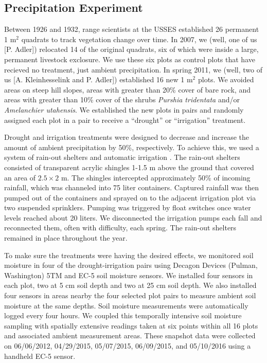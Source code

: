 \documentclass[fleqn,10pt]{wlpeerj} %
\begin{document}
\subsection{Precipitation Experiment}\label{precipitation-experiment}

Between 1926 and 1932, range scientists at the USSES established 26
permanent 1 m\(^2\) quadrats to track vegetation change over time. In
2007, we (well, one of us {[}P. Adler{]}) relocated 14 of the original
quadrats, six of which were inside a large, permanent livestock
exclosure. We use these six plots as control plots that have recieved no
treatment, just ambient precipitation. In spring 2011, we (well, two of
us {[}A. Kleinhesselink and P. Adler{]}) established 16 new 1 m\(^2\)
plots. We avoided areas on steep hill slopes, areas with greater than
20\% cover of bare rock, and areas with greater than 10\% cover of the
shrubs \emph{Purshia tridentata} and/or \emph{Amelanchier utahensis}. We
established the new plots in pairs and randomly assigned each plot in a
pair to receive a ``drought'' or ``irrigation'' treatment.

Drought and irrigation treatments were designed to decrease and increase
the amount of ambient precipitation by 50\%, respectively. To achieve
this, we used a system of rain-out shelters and automatic irrigation
\citep{Gherardi2013}. The rain-out shelters consisted of transparent
acrylic shingles 1-1.5 m above the ground that covered an area of
\(2.5\times2\) m. The shingles intercepted approximately 50\% of
incoming rainfall, which was channeled into 75 liter containers.
Captured rainfall was then pumped out of the containers and sprayed on
to the adjacent irrigation plot via two suspended sprinklers. Pumping
was triggered by float switches once water levels reached about 20
liters. We disconnected the irrigation pumps each fall and reconnected
them, often with difficulty, each spring. The rain-out shelters remained
in place throughout the year.

To make sure the treatments were having the desired effects, we
monitored soil moisture in four of the drought-irrigation pairs using
Decagon Devices (Pulman, Washington) 5TM and EC-5 soil moisture sensors.
We installed four sensors in each plot, two at 5 cm soil depth and two
at 25 cm soil depth. We also installed four sensors in areas nearby the
four selected plot pairs to measure ambient soil moisture at the same
depths. Soil moisture measurements were automatically logged every four
hours. We coupled this temporally intensive soil moisture sampling with
spatially extensive readings taken at six points within all 16 plots and
associated ambient measurement areas. These snapshot data were collected
on 06/06/2012, 04/29/2015, 05/07/2015, 06/09/2015, and 05/10/2016 using
a handheld EC-5 sensor.
\end{document}
